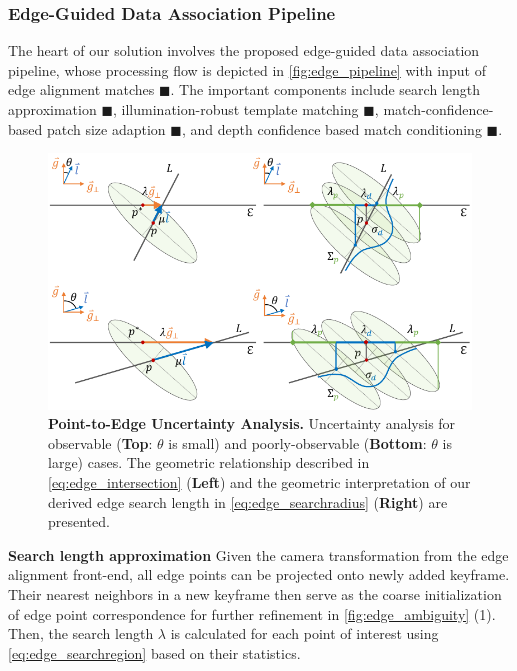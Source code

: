 \subsubsection{Edge-Guided Data Association Pipeline}
The heart of our solution involves the proposed edge-guided data association pipeline, whose processing flow is depicted in \ref{fig:edge_pipeline} with input of edge alignment matches {\color{pink!40!blue!40!white} $\blacksquare$}. The important components include search length approximation {\color{blue!50!white} $\blacksquare$}, illumination-robust template matching {\color{green!50!white} $\blacksquare$}, match-confidence-based patch size adaption {\color{yellow!70!red} $\blacksquare$}, and depth confidence based match conditioning {\color{yellow!30!red} $\blacksquare$}.  

\begin{figure}[t] 
  	\centering
  	\includegraphics[width=0.8\linewidth]{figures/illumination/edge_searcharea.pdf}
    \caption[Point-to-Edge Uncertainty Analysis]{ \textbf{Point-to-Edge Uncertainty Analysis.} Uncertainty analysis for observable (\textbf{Top}: $\theta$ is small) and poorly-observable (\textbf{Bottom}: $\theta$ is large) cases. The geometric relationship described in \ref{eq:edge_intersection} (\textbf{Left}) and the geometric interpretation of our derived edge search length in \ref{eq:edge_searchradius} (\textbf{Right}) are presented. 
	\label{fig:edge_searcharea}}
\end{figure}

\noindent \textbf{Search length approximation}
Given the camera transformation from the edge alignment front-end, all edge points can be projected onto newly added keyframe. 
Their nearest neighbors in a new keyframe then serve as the coarse initialization of edge point correspondence for further refinement in \ref{fig:edge_ambiguity} (1). Then, the search length $\lambda$ is calculated for each point of interest using \ref{eq:edge_searchregion} based on their statistics. 

